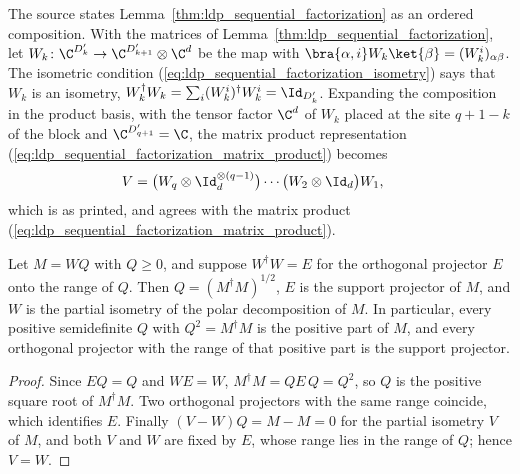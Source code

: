 \begin{remark}
    \label{rem:ldp_sequential_factorization_composition}
    The source states Lemma~\ref{thm:ldp_sequential_factorization} as an
    ordered composition. With the matrices of
    Lemma~\ref{thm:ldp_sequential_factorization}, let
    $W_k\colon\C^{D'_k}\to\C^{D'_{k+1}}\otimes\C^d$ be the map with
    $\bra{\alpha,i}W_k\ket{\beta}=(W_k^i)_{\alpha\beta}$. The isometric condition
    (\ref{eq:ldp_sequential_factorization_isometry}) says that $W_k$ is an isometry,
    $W_k^\dagger W_k=\sum_i(W_k^i)^\dagger W_k^i=\Id_{D'_k}$. Expanding the
    composition in the product basis, with the tensor factor $\C^d$ of $W_k$
    placed at the site $q+1-k$ of the block and $\C^{D'_{q+1}}=\C$, the matrix product representation
    (\ref{eq:ldp_sequential_factorization_matrix_product}) becomes
    \begin{align}
        V
         & =\bigl(W_q\otimes\Id_{d}^{\otimes(q-1)}\bigr)\cdots
        \bigl(W_2\otimes\Id_d\bigr)W_1,
        \label{eq:ldp_sequential_factorization_composition}
    \end{align}
    which is \cite[eqs.~(13)--(15)]{Malz2024Preparation} as printed, and
    agrees with the matrix product
    (\ref{eq:ldp_sequential_factorization_matrix_product}).
\end{remark}

\begin{lemma}
    \label{thm:ldp_polar_uniqueness}
    \leanok
    Let $M=WQ$ with $Q\ge0$, and suppose $W^\dagger W=E$ for the orthogonal
    projector $E$ onto the range of $Q$. Then $Q=(M^\dagger M)^{1/2}$, $E$ is the
    support projector of $M$, and $W$ is the partial isometry of the polar
    decomposition of $M$. In particular, every positive semidefinite $Q$ with
    $Q^2=M^\dagger M$ is the positive part of $M$, and every orthogonal projector
    with the range of that positive part is the support projector.
\end{lemma}
\begin{proof}
    \leanok
    Since $EQ=Q$ and $WE=W$, $M^\dagger M=QE\,Q=Q^2$, so $Q$ is the positive
    square root of $M^\dagger M$. Two orthogonal projectors with the same range
    coincide, which identifies $E$. Finally $(V-W)Q=M-M=0$ for the partial
    isometry $V$ of $M$, and both $V$ and $W$ are fixed by $E$, whose range lies
    in the range of $Q$; hence $V=W$.
\end{proof}


